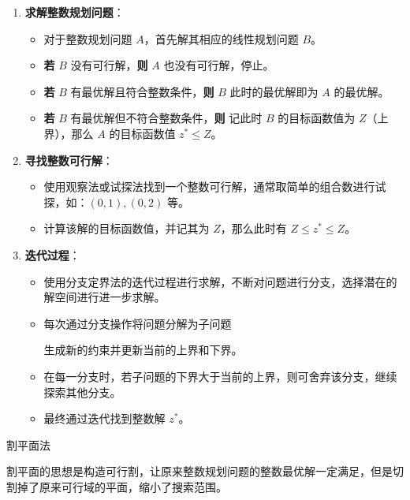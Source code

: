 \documentclass[12pt, a4paper, oneside, UTF8]{ctexbook}
\begin{document}
\begin{enumerate}
    \item \textbf{求解整数规划问题}：
      \begin{itemize}
        \item 对于整数规划问题 \( A \)，首先解其相应的线性规划问题 \( B \)。
        \item \textbf{若} \( B \) 没有可行解，\textbf{则} \( A \) 也没有可行解，停止。
        \item \textbf{若} \( B \) 有最优解且符合整数条件，\textbf{则} \( B \) 此时的最优解即为 \( A \) 的最优解。
        \item \textbf{若} \( B \) 有最优解但不符合整数条件，\textbf{则} 记此时 \( B \) 的目标函数值为 \( Z \)（上界），那么 \( A \) 的目标函数值 \( z^* \leq Z \)。
      \end{itemize}
  
    \item \textbf{寻找整数可行解}：
      \begin{itemize}
        \item 使用观察法或试探法找到一个整数可行解，通常取简单的组合数进行试探，如：\((0,1), (0,2)\) 等。
        \item 计算该解的目标函数值，并记其为 \( Z \)，那么此时有 \( Z \leq z^* \leq Z \)。
      \end{itemize}
  
    \item \textbf{迭代过程}：
      \begin{itemize}
        \item 使用分支定界法的迭代过程进行求解，不断对问题进行分支，选择潜在的解空间进行进一步求解。
        \item 每次通过分支操作将问题分解为子问题
        
        生成新的约束并更新当前的上界和下界。
        \item 在每一分支时，若子问题的下界大于当前的上界，则可舍弃该分支，继续探索其他分支。
        \item 最终通过迭代找到整数解 \( z^* \)。
      \end{itemize}
  \end{enumerate}

\begin{definition}
    割平面法

    割平面的思想是构造可行割，让原来整数规划问题的整数最优解一定满足，但是切割掉了原来可行域的平面，缩小了搜索范围。
\end{definition}
\end{document}

